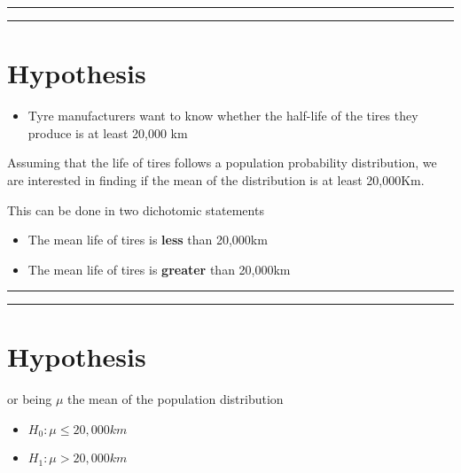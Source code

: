 \documentclass[
]{book}
\providecommand{\tightlist}{%
  \setlength{\itemsep}{0pt}\setlength{\parskip}{0pt}}
\begin{document}
\begin{center}\rule{0.5\linewidth}{0.5pt}\end{center}

\begin{center}\rule{0.5\linewidth}{0.5pt}\end{center}

\hypertarget{hypothesis-2}{%
\section{Hypothesis}\label{hypothesis-2}}

\begin{itemize}
\tightlist
\item
  Tyre manufacturers want to know whether the half-life of the tires they produce is at least 20,000 km
\end{itemize}

Assuming that the life of tires follows a population probability distribution, we are interested in finding if the mean of the distribution is at least 20,000Km.

This can be done in two dichotomic statements

\begin{itemize}
\tightlist
\item
  The mean life of tires is \textbf{less} than 20,000km
\item
  The mean life of tires is \textbf{greater} than 20,000km
\end{itemize}

\begin{center}\rule{0.5\linewidth}{0.5pt}\end{center}

\begin{center}\rule{0.5\linewidth}{0.5pt}\end{center}

\hypertarget{hypothesis-3}{%
\section{Hypothesis}\label{hypothesis-3}}

or being \(\mu\) the mean of the population distribution

\begin{itemize}
\tightlist
\item
  \(H_0: \mu \leq 20,000km\)
\item
  \(H_1: \mu > 20,000km\)
\end{itemize}
\end{document}
